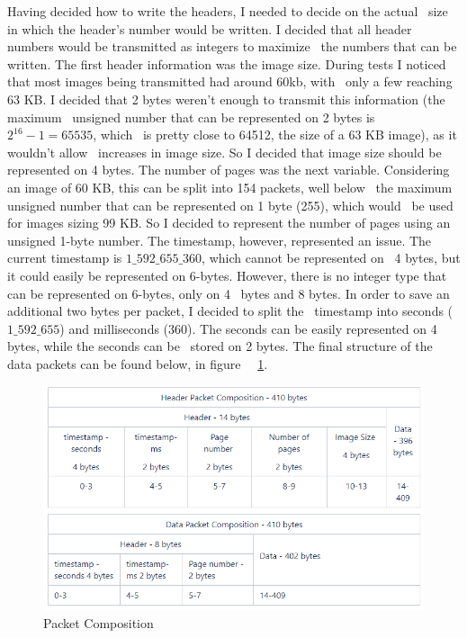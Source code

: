 Having decided how to write the headers, I needed to decide on the actual \
size in which the header's number would be written.
I decided that all header numbers would be transmitted as integers to maximize \
the numbers that can be written.
The first header information was the image size.
During tests I noticed that most images being transmitted had around 60kb, with \
only a few reaching 63 KB.
I decided that 2 bytes weren't enough to transmit this information (the maximum \
unsigned number that can be represented on 2 bytes is $2^{16} - 1 = 65535$, which \
is pretty close to 64512, the size of a 63 KB image), as it wouldn't allow \
increases in image size.
So I decided that image size should be represented on 4 bytes.
The number of pages was the next variable.
Considering an image of 60 KB, this can be split into 154 packets, well below \
the maximum unsigned number that can be represented on 1 byte (255), which would \
be used for images sizing 99 KB.
So I decided to represent the number of pages using an unsigned 1-byte number.
The timestamp, however, represented an issue.
The current timestamp is $1\_592\_655\_360$, which cannot be represented on \
4 bytes, but it could easily be represented on 6-bytes.
However, there is no integer type that can be represented on 6-bytes, only on 4 \
bytes and 8 bytes.
In order to save an additional two bytes per packet, I decided to split the \
timestamp into seconds ($1\_592\_655$) and milliseconds ($360$).
The seconds can be easily represented on 4 bytes, while the seconds can be \
stored on 2 bytes.
The final structure of the data packets can be found below, in figure \
~\ref{fig:udp-packer-packet-composition}.

\begin{figure}[ht]
    \label{fig:udp-packer-packet-composition}
    \includegraphics{img/packet-composition.PNG}
    \caption{Packet Composition}
\end{figure}


